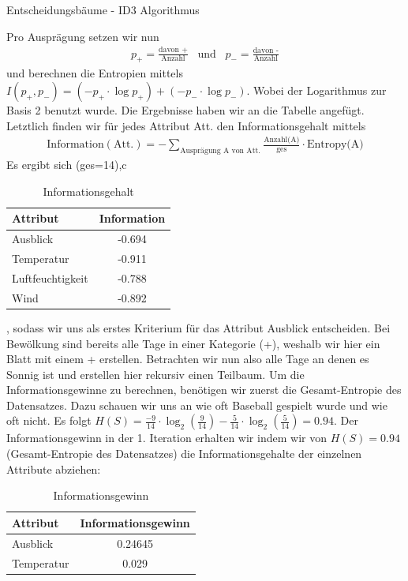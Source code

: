 \begin{task}[credit=16]{Entscheidungsbäume - ID3 Algorithmus}
\begin{subtask}[points=10,title=ID3 Algorithmus]
\begin{solution}
\begin{table}[H]
\end{table}
Pro Ausprägung setzen wir nun
\begin{align*}
p_+=\frac{\text{davon +}}{\text{Anzahl}}\;\;\; \text{und}\;\;\; p_-=\frac{\text{davon -}}{\text{Anzahl}}
\end{align*}
und berechnen die Entropien mittels $I(p_+,p_-)=(-p_+\cdot\log p_+)+(-p_-\cdot\log p_-)$. Wobei der Logarithmus zur Basis 2 benutzt wurde. Die Ergebnisse haben wir an die Tabelle angefügt. Letztlich finden wir für jedes Attribut Att. den Informationsgehalt mittels \begin{align*}
\text{Information}(\text{Att.})=-\sum_{\text{Ausprägung A von Att.}}\frac{\text{Anzahl(A)}}{\text{ges}}\cdot\text{Entropy(A)}
\end{align*}
Es ergibt sich (ges=14),c\begin{table}[H]
	\centering
	\caption{Informationsgehalt}
	\begin{tabular}{l|c}
		\toprule
		\textbf{Attribut} & \textbf{Information}  \\
		\midrule
		Ausblick & -0.694\\
		Temperatur & -0.911\\
		Luftfeuchtigkeit & -0.788\\
		Wind&-0.892\\
		\bottomrule
	\end{tabular}
\end{table}
, sodass wir uns als erstes Kriterium für das Attribut Ausblick entscheiden. Bei Bewölkung sind bereits alle Tage in einer Kategorie (+), weshalb wir hier ein Blatt mit einem + erstellen. Betrachten wir nun also alle Tage an denen es Sonnig ist und erstellen hier rekursiv einen Teilbaum. Um die Informationsgewinne zu berechnen, benötigen wir zuerst die Gesamt-Entropie des Datensatzes. Dazu schauen wir uns an wie oft Baseball gespielt wurde und wie oft nicht. Es folgt $H(S) = \frac{-9}{14} \cdot \log_2(\frac{9}{14}) - \frac{5}{14} \cdot \log_2(\frac{5}{14}) = 0.94$. Der Informationsgewinn in der 1. Iteration erhalten wir indem wir von $H(S) = 0.94$ (Gesamt-Entropie des Datensatzes) die Informationsgehalte der einzelnen Attribute abziehen:
\begin{table}[H]
	\centering
	\caption{Informationsgewinn}
	\begin{tabular}{l|c}
		\toprule
		\textbf{Attribut} & \textbf{Informationsgewinn}  \\
		\midrule
		Ausblick & 0.24645\\
		Temperatur & 0.029\\

\end{tabular}
\end{table}
\end{solution}
\end{subtask}
\end{task}
